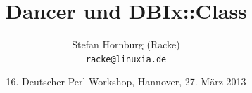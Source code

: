 \usepackage[utf8]{inputenc}
\usepackage[T1]{fontenc}
\usepackage{mathptmx}
\usepackage[scaled=.90]{helvet}
\usepackage{courier}
\usepackage{caption}
\captionsetup{labelformat=empty,labelsep=none}
\usepackage{verbatim}
\usepackage{hyperref}
\usepackage{listings}
\usepackage{ulem}
\lstset{language=Perl,basicstyle=\normalsize,tabsize=3,showstringspaces=false}

\newcommand {\framedgraphic}[2] {
    \begin{frame}{#1}
        \begin{center}
            \texttt{[image: \#2]}
        \end{center}
    \end{frame}
}

\title{Dancer und DBIx::Class}
\author[racke]{Stefan Hornburg (Racke)\\ \texttt{racke@linuxia.de}}
\date{16. Deutscher Perl-Workshop, Hannover, 27. März 2013}


\maketitle{}

\begin{frame}
  \titlepage
\end{frame}

\tableofcontents








